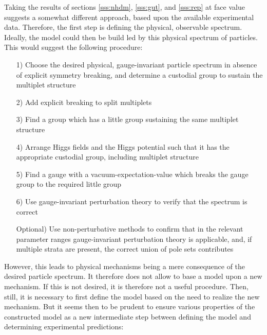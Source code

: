 \documentclass[final,12pt]{article}
\newcommand*{\1}{1\!\!\!\bot}
\begin{document}
Taking the results of sections \ref{sss:nhdm}, \ref{sss:gut}, and \ref{sss:rep} at face value suggests a somewhat different approach, based upon the available experimental data. Therefore, the first step is defining the physical, observable spectrum. Ideally, the model could then be build led by this physical spectrum of particles. This would suggest the following procedure:
\begin{itemize}
 \item[1)] Choose the desired physical, gauge-invariant particle spectrum in absence of explicit symmetry breaking, and determine a custodial group to sustain the multiplet structure
 \item[2)] Add explicit breaking to split multiplets
 \item[3)] Find a group which has a little group sustaining the same multiplet structure \cite{O'Raifeartaigh:1986vq}
 \item[4)] Arrange Higgs fields and the Higgs potential such that it has the appropriate custodial group, including multiplet structure \cite{O'Raifeartaigh:1986vq}
 \item[5)] Find a gauge with a vacuum-expectation-value which breaks the gauge group to the required little group
 \item[6)] Use gauge-invariant perturbation theory to verify that the spectrum is correct
 \item[Optional)] Use non-perturbative methods to confirm that in the relevant parameter ranges gauge-invariant perturbation theory is applicable, and, if multiple strata are present, the correct union of pole sets contributes
\end{itemize}
However, this leads to physical mechanisms being a mere consequence of the desired particle spectrum. It therefore does not allow to base a model upon a new mechanism. If this is not desired, it is therefore not a useful procedure. Then, still, it is necessary to first define the model based on the need to realize the new mechanism. But it seems then to be prudent to ensure various properties of the constructed model as a new intermediate step between defining the model and determining experimental predictions:
\end{document}
